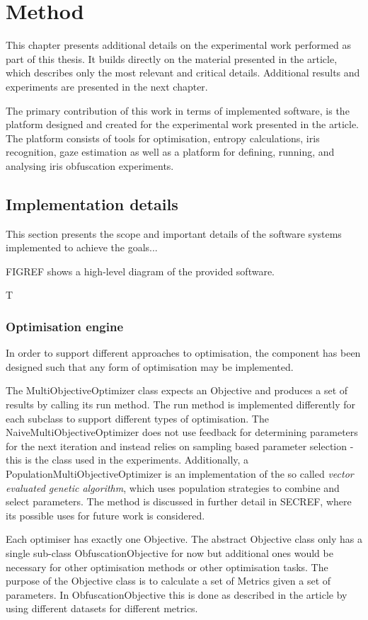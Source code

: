 \chapter{Method}
This chapter presents additional details on the experimental work performed as part of this thesis. It builds directly on the material presented in the article, which describes only the most relevant and critical details. Additional results and experiments are presented in the next chapter.

The primary contribution of this work in terms of implemented software, is the platform designed and created for the experimental work presented in the article. The platform consists of tools for optimisation, entropy calculations, iris recognition, gaze estimation as well as a platform for defining, running, and analysing iris obfuscation experiments. 


\section{Implementation details}
This section presents the scope and important details of the software systems implemented to achieve the goals...

FIGREF shows a high-level diagram of the provided software. 

T


\subsection{Optimisation engine}
In order to support different approaches to optimisation, the component has been designed such that any form of optimisation may be implemented. 

The MultiObjectiveOptimizer class expects an Objective and produces a set of results by calling its run method. The run method is implemented differently for each subclass to support different types of optimisation. The NaiveMultiObjectiveOptimizer does not use feedback for determining parameters for the next iteration and instead relies on sampling based parameter selection - this is the class used in the experiments. Additionally, a PopulationMultiObjectiveOptimizer is an implementation of the so called \textit{vector evaluated genetic algorithm}, which uses population strategies to combine and select parameters. The method is discussed in further detail in SECREF, where its possible uses for future work is considered.

Each optimiser has exactly one Objective. The abstract Objective class only has a single sub-class ObfuscationObjective for now but additional ones would be necessary for other optimisation methods or other optimisation tasks. The purpose of the Objective class is to calculate a set of Metrics given a set of parameters. In ObfuscationObjective this is done as described in the article by using different datasets for different metrics. 

